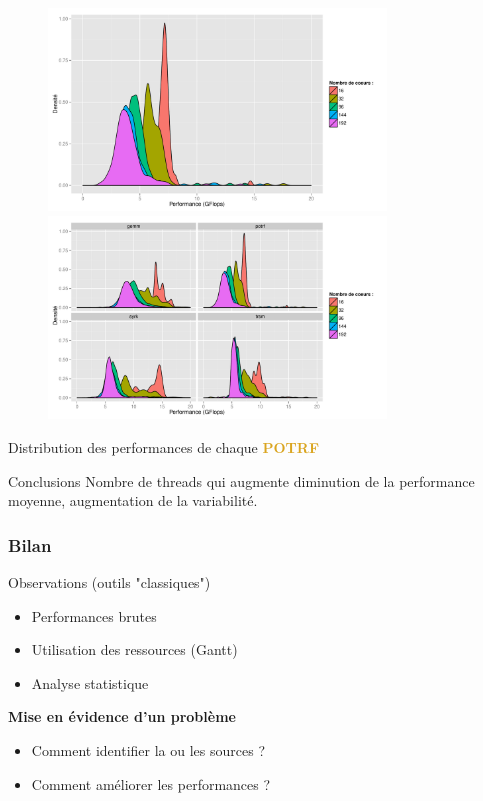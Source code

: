 \documentclass[xcolor={usenames,dvipsnames,svgnames,table}, aspectratio=43]{beamer}
\newcommand{\potrfcolor}[1]{\textcolor{Goldenrod}{\textbf{#1}}\xspace}
\newcommand{\potrf}{\potrfcolor{POTRF}}
\begin{document}
\begin{frame}
\begin{figure}
{    }%
     {%
      \includegraphics[width=0.8\textwidth]{graph/anim-distrib/graph_anim_distrib_4.pdf}%
    }%
     {%
      \includegraphics[width=0.8\textwidth]{graph/graph_distrib_overview.pdf}%
    }%

  \end{figure}
   {
    Distribution des performances de chaque \potrf
  }
   {
    \begin{block}{Conclusions}
      Nombre de threads qui augmente  diminution de la performance moyenne, augmentation de la variabilité.
    \end{block}
  }
\end{frame}


\begin{frame}
  \frametitle{Bilan}

  \begin{block}{Observations (outils "classiques")}
    \begin{itemize}
      \item Performances brutes
      \item Utilisation des ressources (Gantt)
      \item Analyse statistique
    \end{itemize}
    \textbf{Mise en évidence d'un problème}
  \end{block}

  \begin{itemize}
    \item Comment identifier la ou les sources ?
    \item Comment améliorer les performances ?
  \end{itemize}
\end{frame}
\end{document}
